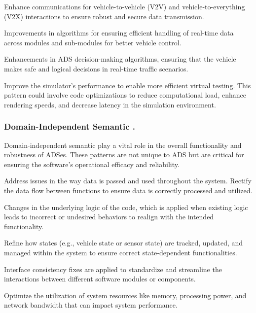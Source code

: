 Enhance communications for vehicle-to-vehicle (V2V) and vehicle-to-everything (V2X) interactions to ensure robust and secure data transmission.

Improvements in algorithms for ensuring efficient handling of real-time data across modules and sub-modules for better vehicle control.

Enhancements in ADS decision-making algorithms, ensuring that the vehicle makes safe and logical decisions in real-time traffic scenarios.

Improve the simulator's performance to enable more efficient virtual testing. This pattern could involve code optimizations to reduce computational load, enhance rendering speeds, and decrease latency in the simulation environment. 


\subsubsection{Domain-Independent Semantic \BFPs.}

Domain-independent semantic \bfps play a vital role in the overall functionality and robustness of ADSes. These patterns are not unique to ADS but are critical for ensuring the software's operational efficacy and reliability.

Address issues in the way data is passed and used throughout the system.
Rectify the data flow between functions to ensure data is correctly processed and utilized.

Changes in the underlying logic of the code, which is applied when existing logic leads to incorrect or undesired behaviors to realign with the intended functionality.

Refine how states (e.g., vehicle state or sensor state) are tracked, updated, and managed within the system to ensure correct state-dependent functionalities.

Interface consistency fixes are applied to standardize and streamline the interactions between different software modules or components. 

Optimize the utilization of system resources like memory, processing power, and network bandwidth that can impact system performance.

